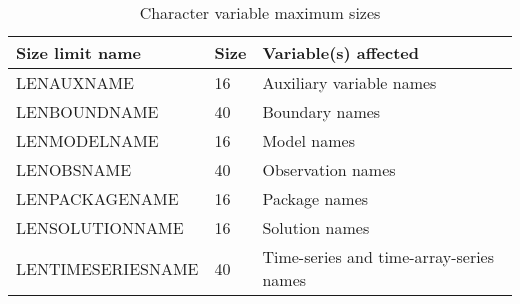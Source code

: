 \begin{table}[H]
\caption{Character variable maximum sizes}
\small
\begin{center}
\begin{tabular*}{\columnwidth}{l l l}
\hline
\hline
\textbf{Size limit name} & \textbf{Size} & \textbf{Variable(s) affected} \\
\hline
LENAUXNAME & 16 & Auxiliary variable names \\
LENBOUNDNAME & 40 & Boundary names \\
LENMODELNAME & 16 & Model names \\
LENOBSNAME & 40 & Observation names \\
LENPACKAGENAME & 16 & Package names \\
LENSOLUTIONNAME & 16 & Solution names \\
LENTIMESERIESNAME & 40 & Time-series and time-array-series names \\
\hline
\end{tabular*}
\label{table:characterlength}
\end{center}
\normalsize
\end{table}
